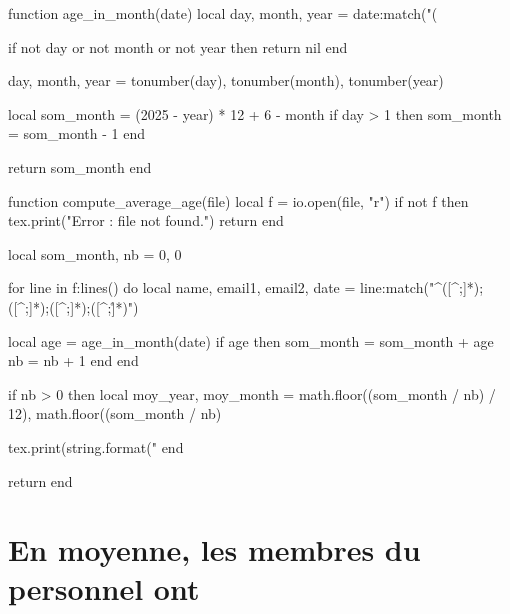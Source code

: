 \begin{luacode*}
function age_in_month(date)
    local day, month, year = date:match("(%

    if not day or not month or not year then
        return nil
    end

    day, month, year = tonumber(day), tonumber(month), tonumber(year)

    local som_month = (2025 - year) * 12 + 6 - month
    if day > 1 then
        som_month = som_month - 1
    end

    return som_month
end

function compute_average_age(file)
    local f = io.open(file, "r")
    if not f then
        tex.print("Error : file not found.")
        return
    end

    local som_month, nb = 0, 0

    for line in f:lines() do
        local name, email1, email2, date = line:match("^([^;]*);([^;]*);([^;]*);([^;\n\r]*)")

        local age = age_in_month(date)
        if age then
            som_month = som_month + age
            nb = nb + 1
        end
    end

    if nb > 0 then
        local moy_year, moy_month = math.floor((som_month / nb) / 12), math.floor((som_month / nb) %

        tex.print(string.format("%
    end

    return
end
\end{luacode*}

\section*{En moyenne, les membres du personnel ont }


